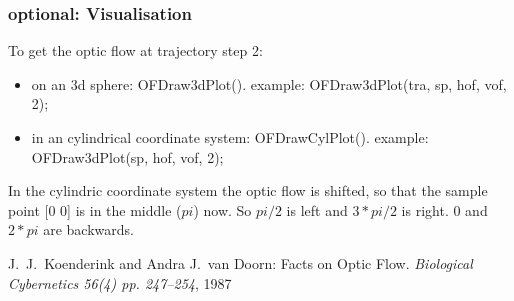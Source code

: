 \documentclass[a4paper]{article}
\begin{document}
\subsubsection{optional: Visualisation} 
To get the optic flow at trajectory step 2:
  \begin{itemize}
  \item on an 3d sphere: OFDraw3dPlot().\newline
example:    OFDraw3dPlot(tra, sp, hof, vof, 2);
 \item in an cylindrical coordinate system: OFDrawCylPlot().\newline
example:    OFDraw3dPlot(sp, hof, vof, 2);
\end{itemize}
In the cylindric coordinate system the optic flow is shifted, so that the sample point [0 0] is in the middle ($pi$) now. So $pi/2$ is left and $3*pi/2$ is right. 0 and $2*pi$ are backwards.

\begin{thebibliography}{References}
J.~J.~Koenderink and Andra J.~van Doorn: Facts on Optic Flow. \textsl{Biological Cybernetics 56(4) pp. 247--254}, 1987
\end{thebibliography}
\end{document}
